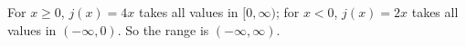 For $x\ge0$, $j(x)=4x$ takes all values in $[0,\infty)$; for $x<0$, $j(x)=2x$ takes all values in $(-\infty,0)$. So the range is $\boxed{(-\infty,\infty)}$.
